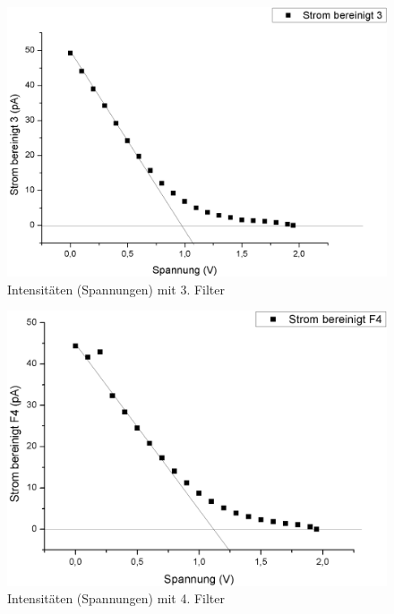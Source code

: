 \documentclass[12pt,a4paper]{article}
\begin{document}
\begin{figure}[H]
	\centering
	\includegraphics[scale=0.5]{./data/Filter3.png}
	\caption{Intensitäten (Spannungen) mit 3. Filter}
	\label{fig:filter3}
\end{figure}

\begin{figure}[H]
	\centering
	\includegraphics[scale=0.5]{./data/Filter4.png}
	\caption{Intensitäten (Spannungen) mit 4. Filter}
	\label{fig:filter4}
\end{figure}
\end{document}
